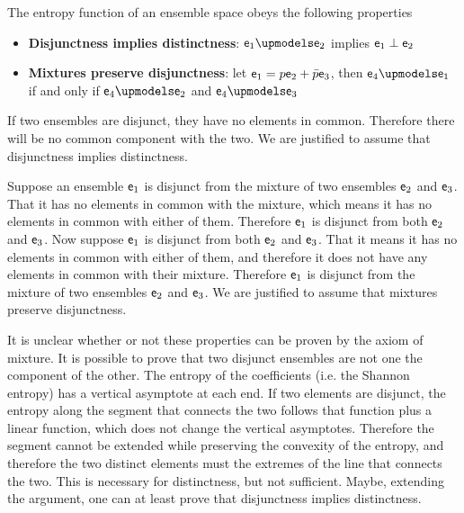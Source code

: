 \begin{axiom}
	The entropy function of an ensemble space obeys the following properties
	\begin{itemize}
		\item \textbf{Disjunctness implies distinctness}: $\ens_1 \disjunct \ens_2$ implies $\mathsf{e}_1 \perp \mathsf{e}_2$
		\item \textbf{Mixtures preserve disjunctness}: let $\mathsf{e}_1 = p \mathsf{e}_2 + \bar{p} \mathsf{e}_3$, then $\ens_4 \disjunct \ens_1$ if and only if $\ens_4 \disjunct \ens_2$ and $\ens_4 \disjunct \ens_3$
	\end{itemize}
\end{axiom}

\begin{justification}
	If two ensembles are disjunct, they have no elements in common. Therefore there will be no common component with the two. We are justified to assume that disjunctness implies distinctness.
	
	Suppose an ensemble $\mathsf{e}_1$ is disjunct from the mixture of two ensembles $\mathsf{e}_2$ and $\mathsf{e}_3$. That it has no elements in common with the mixture, which means it has no elements in common with either of them. Therefore $\mathsf{e}_1$ is disjunct from both $\mathsf{e}_2$ and $\mathsf{e}_3$. Now suppose $\mathsf{e}_1$ is disjunct from both $\mathsf{e}_2$ and $\mathsf{e}_3$. That it means it has no elements in common with either of them, and therefore it does not have any elements in common with their mixture. Therefore $\mathsf{e}_1$ is disjunct from the mixture of two ensembles $\mathsf{e}_2$ and $\mathsf{e}_3$. We are justified to assume that mixtures preserve disjunctness.
\end{justification}

\begin{remark}
	It is unclear whether or not these properties can be proven by the axiom of mixture. It is possible to prove that two disjunct ensembles are not one the component of the other. The entropy of the coefficients (i.e. the Shannon entropy) has a vertical asymptote at each end. If two elements are disjunct, the entropy along the segment that connects the two follows that function plus a linear function, which does not change the vertical asymptotes. Therefore the segment cannot be extended while preserving the convexity of the entropy, and therefore the two distinct elements must the extremes of the line that connects the two. This is necessary for distinctness, but not sufficient. Maybe, extending the argument, one can at least prove that disjunctness implies distinctness.
\end{remark}

